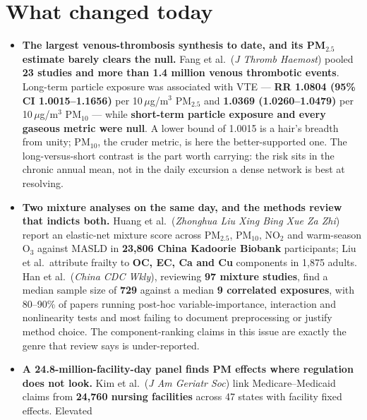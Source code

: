 \documentclass[10pt]{article}
\begin{document}
\vspace{3mm}

\section*{\sffamily\bfseries\color{Deep}What changed today}
\vspace{-1.5mm}{\color{Amber}\rule{\linewidth}{1.1pt}}\vspace{2.5mm}

\footnotesize
\begin{itemize}
\item \textbf{The largest venous-thrombosis synthesis to date, and its PM$_{2.5}$ estimate
barely clears the null.} Fang et al.\ (\textit{J Thromb Haemost}) pooled \textbf{23 studies
and more than 1.4 million venous thrombotic events}. Long-term particle exposure was
associated with VTE --- \textbf{RR 1.0804 (95\% CI 1.0015--1.1656)} per
10\,$\mu$g/m$^3$ PM$_{2.5}$ and \textbf{1.0369 (1.0260--1.0479)} per 10\,$\mu$g/m$^3$
PM$_{10}$ --- while \textbf{short-term particle exposure and every gaseous metric were
null}. A lower bound of 1.0015 is a hair's breadth from unity; PM$_{10}$, the cruder
metric, is here the better-supported one. The long-versus-short contrast is the part worth
carrying: the risk sits in the chronic annual mean, not in the daily excursion a dense
network is best at resolving.
\item \textbf{Two mixture analyses on the same day, and the methods review that indicts
both.} Huang et al.\ (\textit{Zhonghua Liu Xing Bing Xue Za Zhi}) report an elastic-net
mixture score across PM$_{2.5}$, PM$_{10}$, NO$_2$ and warm-season O$_3$ against MASLD in
\textbf{23,806 China Kadoorie Biobank} participants; Liu et al.\ attribute frailty to
\textbf{OC, EC, Ca and Cu} components in 1,875 adults. Han et al.\ (\textit{China CDC
Wkly}), reviewing \textbf{97 mixture studies}, find a median sample size of \textbf{729}
against a median \textbf{9 correlated exposures}, with 80--90\% of papers running post-hoc
variable-importance, interaction and nonlinearity tests and most failing to document
preprocessing or justify method choice. The component-ranking claims in this issue are
exactly the genre that review says is under-reported.
\item \textbf{A 24.8-million-facility-day panel finds PM effects where regulation does not
look.} Kim et al.\ (\textit{J Am Geriatr Soc}) link Medicare--Medicaid claims from
\textbf{24,760 nursing facilities} across 47 states with facility fixed effects. Elevated

\end{itemize}
\end{document}
